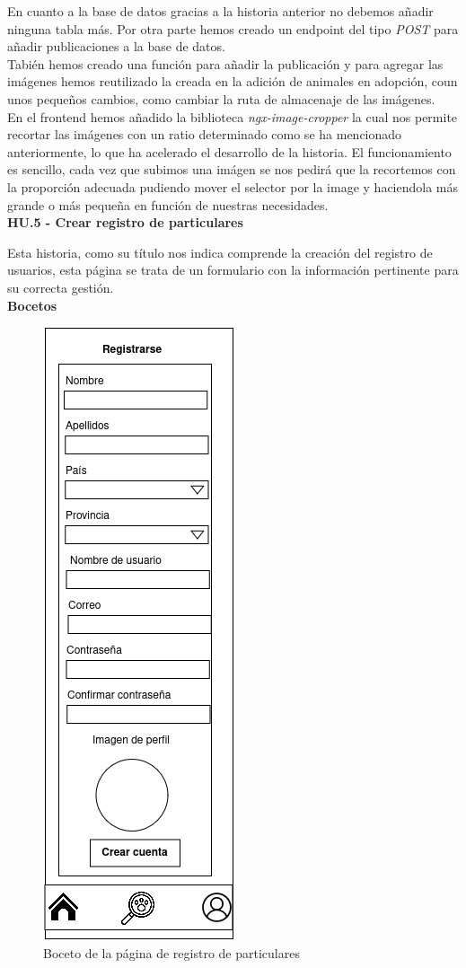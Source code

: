 En cuanto a la base de datos gracias a la historia anterior no debemos añadir ninguna tabla más. Por otra parte hemos creado un endpoint del tipo \textit{POST} para añadir publicaciones a la base de datos. \\

Tabién hemos creado una función para añadir la publicación y para agregar las imágenes hemos reutilizado la creada en la adición de animales en adopción, coun unos pequeños cambios, como cambiar la ruta de almacenaje de las imágenes. \\ 

En el frontend hemos añadido la biblioteca \textit{ngx-image-cropper} la cual nos permite recortar las imágenes con un ratio determinado como se ha mencionado anteriormente, lo que ha acelerado el desarrollo de la historia. El funcionamiento es sencillo, cada vez que subimos una imágen se nos pedirá que la recortemos con la proporción adecuada pudiendo mover el selector por la image y haciendola más grande o más pequeña en función de nuestras necesidades. \\


\Large{\textbf{HU.5 - Crear registro de particulares}}

Esta historia, como su título nos indica comprende la creación del registro de usuarios, esta página se trata de un formulario con la información pertinente para su correcta gestión.\\

\textbf{Bocetos}
\begin{figure}[H]
	\centering
	\includegraphics[width=0.31\linewidth]{"sprint 2/hu5/registro_particulares"}
	\caption{Boceto de la página de registro de particulares}
	\label{fig:registroparticulares}
\end{figure}

